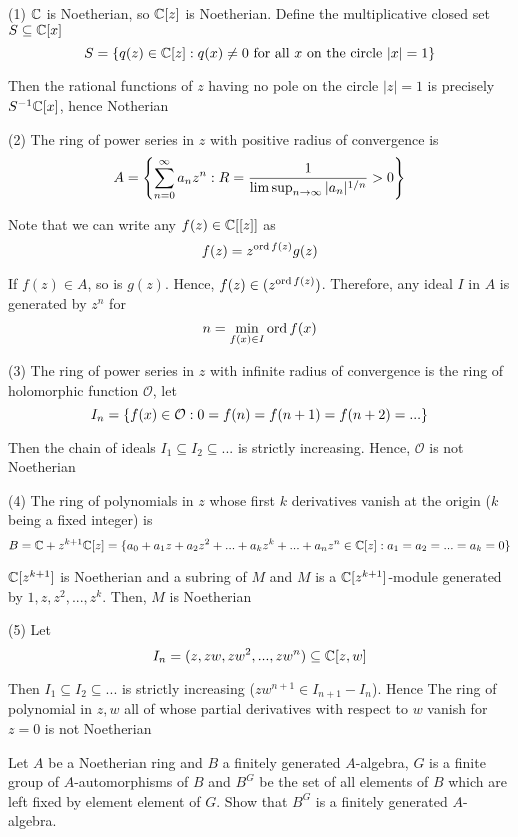 \begin{longproof}
	(1) $\C$ is Noetherian, so $\C[z]$ is Noetherian. Define the multiplicative closed set $S \subseteq \C[x]$
	$$
		S = \set{q(z) \in \C[z]: q(x) \neq 0 \text{ for all $x$ on the circle $|x| = 1$}}
	$$
	
	Then the rational functions of $z$ having no pole on the circle $|z| = 1$ is precisely $S^{-1} \C[x]$, hence Notherian
	
	(2) The ring of power series in $z$ with positive radius of convergence is
	$$
		A = \set*{\sum_{n=0}^\infty a_n z^n: R = \frac{1}{\limsup_{n \to \infty} |a_n|^{1/n}} > 0}
	$$
	
	Note that we can write any $f(z) \in \C[[z]]$ as 
	$$
		f(z) = z^{\ord f(z)} g(z)
	$$
	
	If $f(z) \in A$, so is $g(z)$. Hence, $f(z) \in (z^{\ord f(z)} )$. Therefore, any ideal $I$ in $A$ is generated by $z^n$ for
	$$
		n = \min_{f(x) \in I} \ord f(x)
	$$
	
	(3) The ring of power series in $z$ with infinite radius of convergence is the ring of holomorphic function $\mathcal{O}$, let
	$$
		I_n = \set{f(x) \in \mathcal{O}: 0 = f(n) = f(n+1) = f(n+2) = ...}
	$$
	
	Then the chain of ideals $I_1 \subseteq I_2 \subseteq ...$ is strictly increasing. Hence, $\mathcal{O}$ is not Noetherian
	
	(4) The ring of polynomials in $z$ whose first $k$ derivatives vanish at the origin ($k$ being a fixed integer) is
	$$
		B = \C + z^{k+1} \C[z] = \set{a_0 + a_1 z + a_2 z^2 + ... + a_k z^k + ... + a_n z^n \in \C[z]: a_1 = a_2 = ... = a_k = 0}
	$$
	
	$\C[z^{k+1}]$ is Noetherian and a subring of $M$ and $M$ is a $\C[z^{k+1}]$-module generated by $1, z, z^2, ..., z^k$. Then, $M$ is Noetherian
	
	(5) Let
	$$
		I_n = (z, zw, zw^2, ..., zw^n) \subseteq \C[z, w]
	$$
	
	Then $I_1 \subseteq I_2 \subseteq ...$ is strictly increasing ($zw^{n+1} \in I_{n+1} - I_n$). Hence The ring of polynomial in $z, w$ all of whose partial derivatives with respect to $w$ vanish for $z = 0$ is not Noetherian
\end{longproof}


\begin{problem}
	Let $A$ be a Noetherian ring and $B$ a finitely generated $A$-algebra, $G$ is a finite group of $A$-automorphisms of $B$ and $B^G$ be the set of all elements of $B$ which are left fixed by element element of $G$. Show that $B^G$ is a finitely generated $A$-algebra.
\end{problem}

